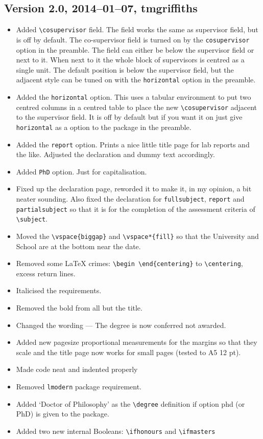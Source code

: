 \documentclass[12pt,oneside]{article}
\newcommand{\option}[1]{\texttt{\color{UOWblue}#1}}
\newcommand{\command}[1]{\texttt{\color{UOWred}#1}}
\begin{document}
\subsection*{Version 2.0, 2014–01–07, tmgriffiths}
\begin{itemize}
    \item Added \command{\textbackslash{}cosupervisor} field. The field works the same as supervisor field, but is off by default. The co-supervisor field is turned on by the \option{cosupervisor} option in the preamble. The field can either be below the supervisor field or next to it. When next to it the whole block of supervisors is centred as a single unit. The default position is below the supervisor field, but the adjacent style can be tuned on with the \option{horizontal} option in the preamble.
    \item Added the \option{horizontal} option. This uses a tabular environment to put two centred columns in a centred table to place the new \command{\textbackslash{}cosupervisor} adjacent to the supervisor field. It is off by default but if you want it on just give \option{horizontal} as a option to the package in the preamble.
    \item Added the \option{report} option. Prints a nice little title page for lab reports and the like. Adjusted the declaration and dummy text accordingly.
    \item Added \option{PhD} option. Just for capitalisation.
    \item Fixed up the declaration page, reworded it to make it, in my opinion, a bit neater sounding. Also fixed the declaration for \option{fullsubject}, \option{report} and \option{partialsubject} so that it is for the completion of the assessment criteria of \command{\textbackslash{}subject}.
    \item Moved the \texttt{\textbackslash{}vspace\{biggap\}} and \texttt{\textbackslash{}vspace*\{fill\}} so that the University
and School are at the bottom near the date.
    \item Removed some \LaTeX{} crimes: \texttt{\textbackslash{}begin \textbackslash{}end\{centering\}\texttt{}} to \texttt{\textbackslash{}centering}, excess return lines.
    \item Italicised the requirements.
    \item Removed the bold from all but the title.
    \item Changed the wording — The degree is now conferred not awarded.
    \item Added new pagesize proportional measurements for the margins so that they scale and the title page now works for small pages (tested to A5 12 pt).
    \item Made code neat and indented properly
    \item Removed \texttt{lmodern} package requirement.
    \item Added `Doctor of Philosophy' as the \command{\textbackslash{}degree} definition if option phd (or
PhD) is given to the package.
    \item Added two new internal Booleans: \command{\textbackslash{}ifhonours} and \command{\textbackslash{}ifmasters}
    
\end{itemize}
\end{document}
